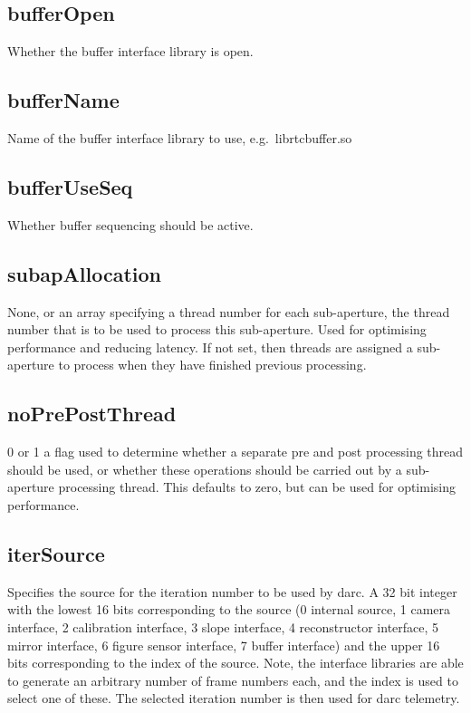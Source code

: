\documentclass[a4,10pt]{article}
\begin{document}
\subsection{bufferOpen}
Whether the buffer interface library is open.

\subsection{bufferName}
Name of the buffer interface library to use, e.g.\ librtcbuffer.so

\subsection{bufferUseSeq}
Whether buffer sequencing should be active.

\subsection{subapAllocation}
None, or an array specifying a thread number for each sub-aperture,
the thread number that is to be used to process this sub-aperture.
Used for optimising performance and reducing latency.  If not set,
then threads are assigned a sub-aperture to process when they have
finished previous processing.

\subsection{noPrePostThread}
0 or 1 a flag used to determine whether a separate pre and post
processing thread should be used, or whether these operations should
be carried out by a sub-aperture processing thread.  This defaults to
zero, but can be used for optimising performance.

\subsection{iterSource}
Specifies the source for the iteration number to be used by darc.
A 32 bit integer with the lowest 16 bits corresponding to the source
(0 internal source, 1 camera interface, 2 calibration interface, 3
slope interface, 4 reconstructor interface, 5 mirror interface, 6
figure sensor interface, 7 buffer interface) and the upper 16 bits
corresponding to the index of the source.  Note, the interface
libraries are able to generate an arbitrary number of frame numbers
each, and the index is used to select one of these.  The selected
iteration number is then used for darc telemetry. 
\end{document}
